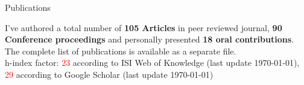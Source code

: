 \begin{cvblock}{Publications}
\end{cvblock}
I've authored a total number of \textbf{105 Articles} in peer reviewed journal,
\textbf{90 Conference proceedings} and personally presented \textbf{18 oral
contributions}. The complete list of publications is available as a
separate file. \\
h-index factor: \textcolor{red}{23} according to ISI Web of Knowledge
(last update \today), \textcolor{red}{29} according to Google Scholar (last update \today)

